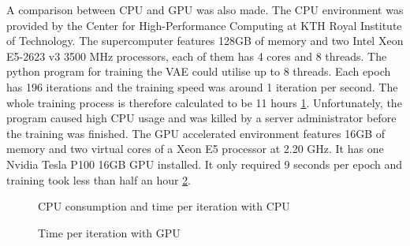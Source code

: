 \documentclass[11pt,a4paper]{report}
\begin{document}
A comparison between CPU and GPU was also made. The CPU environment was provided by the Center for High-Performance Computing at KTH Royal Institute of Technology. The supercomputer features 128GB of memory and two Intel Xeon E5-2623 v3 3500 MHz processors, each of them has 4 cores and 8 threads. The python program for training the VAE could utilise up to 8 threads. Each epoch has 196 iterations and the training speed was around 1 iteration per second. The whole training process is therefore calculated to be 11 hours \ref{fig:pdc}. Unfortunately, the program caused high CPU usage and was killed by a server administrator before the training was finished. The GPU accelerated environment features 16GB of memory and two virtual cores of a Xeon E5 processor at 2.20 GHz. It has one Nvidia Tesla P100 16GB GPU installed. It only required 9 seconds per epoch and training took less than half an hour \ref{fig:colab}.


\begin{figure}[h!]
\noindent{}
\caption{CPU consumption and time per iteration with CPU}
  \label{fig:pdc}
\end{figure}

\begin{figure}[h!]
\noindent{}
\caption{Time per iteration with GPU}
  \label{fig:colab}
\end{figure}


\printbibliography[title={References}]
\end{document}
